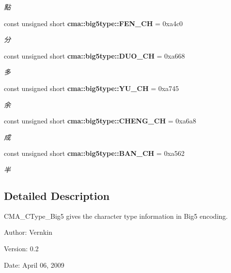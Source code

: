 \begin{CompactItemize}
\begin{CompactList}\small\item\em 點 \item\end{CompactList}\item 
const unsigned short {\bf cma::big5type::FEN\_\-CH} = 0xa4c0\label{namespacecma_1_1big5type_4dd0b0d33393c2d9a27ccee6ab9662d5}

\begin{CompactList}\small\item\em 分 \item\end{CompactList}\item 
const unsigned short {\bf cma::big5type::DUO\_\-CH} = 0xa668\label{namespacecma_1_1big5type_1d5fd266d7448fa2f0ab3ed9ca390fca}

\begin{CompactList}\small\item\em 多 \item\end{CompactList}\item 
const unsigned short {\bf cma::big5type::YU\_\-CH} = 0xa745\label{namespacecma_1_1big5type_e6dac35944033f4c68276abe1e15bf4e}

\begin{CompactList}\small\item\em 余 \item\end{CompactList}\item 
const unsigned short {\bf cma::big5type::CHENG\_\-CH} = 0xa6a8\label{namespacecma_1_1big5type_bcf97c7f2e48d885c33280047c6b6f1d}

\begin{CompactList}\small\item\em 成 \item\end{CompactList}\item 
const unsigned short {\bf cma::big5type::BAN\_\-CH} = 0xa562\label{namespacecma_1_1big5type_02e5ecec79d29ddd78667e14417ff945}

\begin{CompactList}\small\item\em 半 \item\end{CompactList}\end{CompactItemize}


\subsection{Detailed Description}
CMA\_\-CType\_\-Big5 gives the character type information in Big5 encoding. 

\begin{Desc}
\item[Author:]Vernkin \end{Desc}
\begin{Desc}
\item[Version:]0.2 \end{Desc}
\begin{Desc}
\item[Date:]April 06, 2009 \end{Desc}
